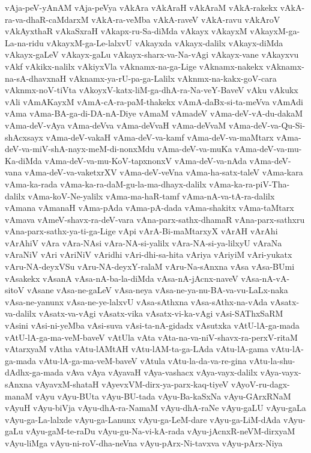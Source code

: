 {vAja-peV-yAnAM
vAja-peVya
vAkAra
vAkAraH
vAkAraM
vAkA-rakekx
vAkA-ra-va-dhaR-caMdarxM
vAkA-ra-veMba
vAkA-raveV
vAkA-ravu
vAkAroV
vAkAyxthaR
vAkaSxraH
vAkapx-ru-Sa-diMda
vAkayx
vAkayxM
vAkayxM-ga-La-na-ridu
vAkayxM-ga-Le-lalxvU
vAkayxda
vAkayx-dalilx
vAkayx-diMda
vAkayx-gaLeV
vAkayx-gaLu
vAkayx-sharx-va-Na-vAgi
vAkayx-vane
vAkayxvu
vAkf
vAkikx-nalilx
vAkiyxVla
vAknamx-na-ga-Lige
vAknamx-nakekx
vAknamx-na-sA-dhavxnaH
vAknamx-ya-rU-pa-ga-Lalilx
vAknmx-na-kakx-goV-cara
vAknmx-noV-tiVta
vAkoyxV-katx-liM-ga-dhA-ra-Na-veY-BaveV
vAku
vAkukx
vAli
vAmAKayxM
vAmA-cA-ra-paM-thakekx
vAmA-daBx-si-ta-meVva
vAmAdi
vAma
vAma-BA-ga-di-DA-nA-Diye
vAmaM
vAmadeV
vAma-deV-vA-du-dakaM
vAma-deV-vAya
vAma-deVva
vAma-deVvaH
vAma-deVvaM
vAma-deV-va-Qu-Si-shAcxsayx
vAma-deV-vakaH
vAma-deV-va-kamf
vAma-deV-va-maMtarx
vAma-deV-va-miV-shA-nayx-meM-di-nonxMdu
vAma-deV-va-muKa
vAma-deV-va-mu-Ka-diMda
vAma-deV-va-mu-KoV-tapxnonxV
vAma-deV-va-nAda
vAma-deV-vana
vAma-deV-va-vaketxrXV
vAma-deV-veVna
vAma-ha-satx-taleV
vAma-kara
vAma-ka-rada
vAma-ka-ra-daM-gu-la-ma-dhayx-dalilx
vAma-ka-ra-piV-Tha-dalilx
vAma-koV-Ne-yalilx
vAma-ma-haR-tamf
vAma-nA-va-tA-ra-dalilx
vAmana
vAmanaH
vAma-pAda
vAma-pA-dada
vAma-shakitx
vAma-taMtarx
vAmava
vAmeV-shavx-ra-deV-vara
vAna-parx-sathx-dhamaR
vAna-parx-sathxru
vAna-parx-sathx-ya-ti-ga-Lige
vApi
vArA-Bi-maMtarxyX
vArAH
vArAhi
vArAhiV
vAra
vAra-NAsi
vAra-NA-si-yalilx
vAra-NA-si-ya-lilxyU
vAraNa
vAraNiV
vAri
vAriNiV
vAridhi
vAri-dhi-sa-hita
vAriya
vAriyiM
vAri-yukatx
vAru-NA-deyxVSu
vAru-NA-deyxY-ralaM
vAru-Na-sAnxna
vAsa
vAsa-BUmi
vAsakekx
vAsanA
vAsa-nA-ba-la-diMda
vAsa-nA-jAcnx-naveV
vAsa-nA-vA-sitoV
vAsane
vAsa-ne-gaLeV
vAsa-neya
vAsa-ne-ya-nu-BA-va-vu-LaLx-naka
vAsa-ne-yanunx
vAsa-ne-ye-lalxvU
vAsa-sAthxna
vAsa-sAthx-na-vAda
vAsatx-va-dalilx
vAsatx-va-vAgi
vAsatx-vika
vAsatx-vi-ka-vAgi
vAsi-SAThxSaRM
vAsini
vAsi-ni-yeMba
vAsi-suva
vAsi-ta-nA-gidadx
vAsutxka
vAtU-lA-ga-mada
vAtU-lA-ga-ma-veM-baveV
vAtUla
vAta
vAta-na-va-niV-shavx-ra-perxV-ritaM
vAtarxyaM
vAtha
vAtu-lAMtAH
vAtu-lAM-ta-ga-LAda
vAtu-lA-gama
vAtu-lA-ga-mada
vAtu-lA-ga-ma-veM-baveV
vAtula
vAtu-la-da-va-re-gina
vAtu-la-shu-dAdhx-ga-mada
vAva
vAya
vAyavaH
vAya-vashacx
vAya-vayx-dalilx
vAya-vayx-sAnxna
vAyavxM-shataH
vAyevxVM-dirx-ya-parx-kaq-tiyeV
vAyoV-ru-dagx-manaM
vAyu
vAyu-BUta
vAyu-BU-tada
vAyu-Ba-kaSxNa
vAyu-GArxRNaM
vAyuH
vAyu-biVja
vAyu-dhA-ra-NamaM
vAyu-dhA-raNe
vAyu-gaLU
vAyu-gaLa
vAyu-ga-La-lalxde
vAyu-ga-Lanunx
vAyu-ga-LeM-dare
vAyu-ga-LiM-dAda
vAyu-gaLu
vAyu-gaM-te-raDu
vAyu-gu-Na-vi-kA-rada
vAyu-jAcnxR-neVM-dirxyaM
vAyu-liMga
vAyu-ni-roV-dha-neVna
vAyu-pArx-Ni-tavxva
vAyu-pArx-Niya
}
